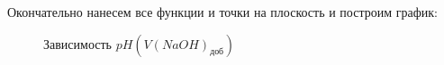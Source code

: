 \documentclass[a4paper,12pt]{article}
\begin{document}
Окончательно нанесем все функции и точки на плоскость и построим график:

\begin{figure}
	
	\centerline{}
	
	\caption{Зависимость $pH (V(NaOH)_{\text{доб}})$}
	
	\label{label_this_fig}
	
\end{figure}
\end{document}
